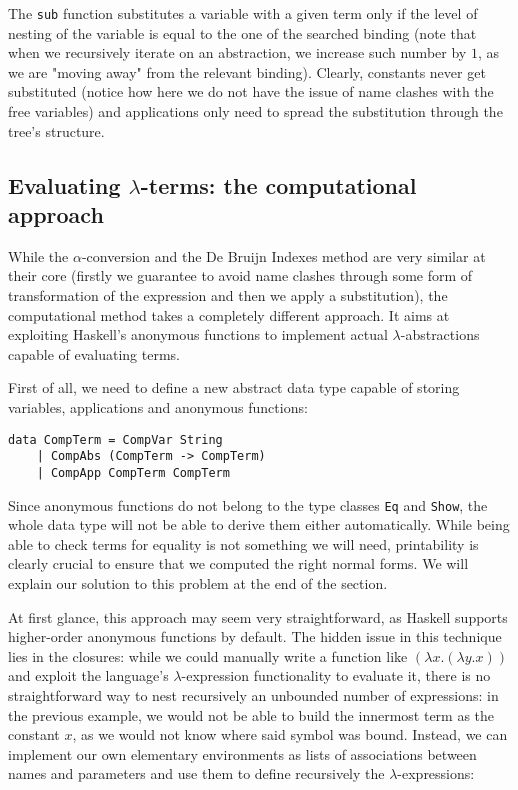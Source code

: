 \documentclass{article}
\begin{document}
The \lstinline|sub| function substitutes a variable with a given term only if the level of nesting of the variable is equal to the one of the searched binding (note that when we recursively iterate on an abstraction, we increase such number by $1$, as we are "moving away" from the relevant binding). Clearly, constants never get substituted (notice how here we do not have the issue of name clashes with the free variables) and applications only need to spread the substitution through the tree's structure.

\subsection{Evaluating $\lambda$-terms: the computational approach} \label{sec:computational}

While the $\alpha$-conversion and the De Bruijn Indexes method are very similar at their core (firstly we guarantee to avoid name clashes through some form of transformation of the expression and then we apply a substitution), the computational method takes a completely different approach. It aims at exploiting Haskell's anonymous functions to implement actual $\lambda$-abstractions capable of evaluating terms.

First of all, we need to define a new abstract data type capable of storing variables, applications and anonymous functions:

\begin{lstlisting}
data CompTerm = CompVar String
    | CompAbs (CompTerm -> CompTerm)
    | CompApp CompTerm CompTerm
\end{lstlisting}

Since anonymous functions do not belong to the type classes \lstinline|Eq| and \lstinline|Show|, the whole data type will not be able to derive them either automatically. While being able to check terms for equality is not something we will need, printability is clearly crucial to ensure that we computed the right normal forms. We will explain our solution to this problem at the end of the section.

At first glance, this approach may seem very straightforward, as Haskell supports higher-order anonymous functions by default. The hidden issue in this technique lies in the closures: while we could manually write a function like $(\lambda x . (\lambda y . x))$ and exploit the language's $\lambda$-expression functionality to evaluate it, there is no straightforward way to nest recursively an unbounded number of expressions: in the previous example, we would not be able to build the innermost term as the constant $x$, as we would not know where said symbol was bound. Instead, we can implement our own elementary environments as lists of associations between names and parameters and use them to define recursively the $\lambda$-expressions:
\end{document}
